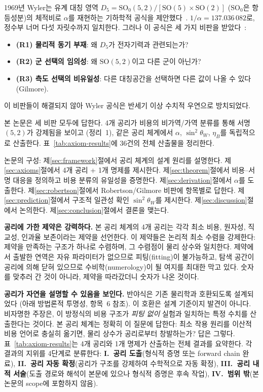 \documentclass[entropy,article,submit,pdftex,oneauthor]{Definitions/mdpi}
\begin{document}
1969년 Wyler는 유계 대칭 영역 $D_5 = \mathrm{SO}_0(5,2)/[\mathrm{SO}(5)\times\mathrm{SO}(2)]$ ($\mathrm{SO}_0$은 항등성분)의 체적비로 $\alpha$를 재현하는 기하학적 공식을 제안했다~\cite{wyler1969,wyler1971}. $1/\alpha = 137.036\,082$로, 정수부 너머 다섯 자릿수까지 일치한다. 그러나 이 공식은 세 가지 비판을 받았다~\cite{robertson1971,gilmore1972}:
\begin{itemize}
\item \textbf{(R1) 물리적 동기 부재}: 왜 $D_5$가 전자기력과 관련되는가?
\item \textbf{(R2) 군 선택의 임의성}: 왜 $\mathrm{SO}(5,2)$이고 다른 군이 아닌가?
\item \textbf{(R3) 측도 선택의 비유일성}: 다른 대칭공간을 선택하면 다른 값이 나올 수 있다(Gilmore).
\end{itemize}

이 비판들이 해결되지 않아 Wyler 공식은 반세기 이상 수치적 우연으로 방치되었다.

본 논문은 세 비판 모두에 답한다. 4개 공리가 비용의 비가역/가역 분류를 통해 서명 $(5,2)$가 강제됨을 보이고 (정리~1), 같은 공리 체계에서 $\alpha$, $\sin^2\theta_W$, $\eta_B$를 독립적으로 산출한다. 표~\ref{tab:axiom-results}에 36건의 전체 산출물을 정리한다.

논문의 구성: 제\ref{sec:framework}절에서 공리 체계의 설계 원리를 설명한다. 제\ref{sec:axioms}절에서 4개 공리 + 1개 명제를 제시한다. 제\ref{sec:theorem}절에서 비용--서명 대응을 정의하고 비용 분류의 유일성을 증명한다. 제\ref{sec:derivation}절에서 $\alpha$를 도출한다. 제\ref{sec:robertson}절에서 Robertson/Gilmore 비판에 항목별로 답한다. 제\ref{sec:prediction}절에서 구조적 일관성 확인 $\sin^2\theta_W$를 제시한다. 제\ref{sec:discussion}절에서 논의한다. 제\ref{sec:conclusion}절에서 결론을 맺는다.

\textbf{공리에 가한 제약은 강력하다.} 본 공리 체계의 4개 공리는 각각 최소 비용, 원자성, 직교성, 인과율 보존이라는 제약을 선언한다. 이 제약들은 논리적 최소 수렴을 강제한다: 제약을 만족하는 구조가 하나로 수렴하며, 그 수렴점이 물리 상수와 일치한다. 제약에서 출발한 연역은 자유 파라미터가 없으므로 피팅(fitting)이 불가능하고, 탐색 공간이 공리에 의해 닫혀 있으므로 수비학(numerology)이 될 여지를 최대한 막고 있다. 숫자를 맞추러 간 것이 아니라, 제약을 따라갔더니 숫자가 나온 것이다.

\textbf{공리가 자연을 설명할 수 있음을 보인다.} 반야식은 기존 물리학과 호환되도록 설계되었다 (아래 방법론적 투명성, 항목~6 참조). 이 호환은 설계 기준이지 발견이 아니다. 비자명한 주장은, 이 방정식의 비용 구조가 \emph{피팅 없이} 실험과 일치하는 특정 수치를 산출한다는 것이다. 본 공리 체계는 정확히 이 질문에 답한다: 최소 작용 원리를 이산적 비용 언어로 충실히 옮기면, 물리 상수가 공리로부터 창발하는가? 답은 그렇다. 표~\ref{tab:axiom-results}는 4개 공리와 1개 명제가 산출하는 전체 결과를 요약한다. 각 결과의 지위를 4단계로 분류한다: \textbf{I.~공리 도출}(형식적 증명 또는 forward chain 완료), \textbf{II.~공리 자동 확정}(공리가 구조를 강제하여 수학적으로 자동 확정), \textbf{III.~공리 내적 서술}(도출 경로와 해석이 본문에 있으나 형식적 증명은 후속 작업), \textbf{IV.~범위 밖}(본 논문의 scope에 포함하지 않음).
\end{document}
